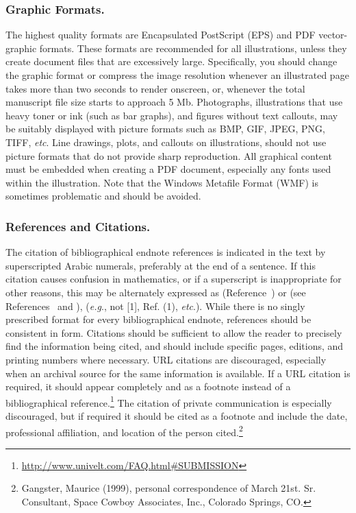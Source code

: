 \documentclass[letterpaper, preprint, paper,11pt]{AAS}	%
\begin{document}
\subsubsection{Graphic Formats.} 
The highest quality formats are Encapsulated PostScript (EPS) and PDF vector-graphic formats. These formats are recommended for all illustrations, unless they create document files that are excessively large. Specifically, you should change the graphic format or compress the image resolution whenever an illustrated page takes more than two seconds to render onscreen, or, whenever the total manuscript file size starts to approach 5 Mb. Photographs, illustrations that use heavy toner or ink (such as bar graphs), and figures without text callouts, may be suitably displayed with picture formats such as BMP, GIF, JPEG, PNG, TIFF, \emph{etc}. Line drawings, plots, and callouts on illustrations, should not use picture formats that do not provide sharp reproduction. All graphical content must be embedded when creating a PDF document, especially any fonts used within the illustration. Note that the Windows Metafile Format (WMF) is sometimes problematic and should be avoided.


\subsubsection{References and Citations.} 
The citation of bibliographical endnote references is indicated in the text by superscripted Arabic numerals, preferably at the end of a sentence.\cite{doe2005, style1959}   If this citation causes confusion in mathematics, or if a superscript is inappropriate for other reasons, this may be alternately expressed as (Reference~) or (see References~ and ), (\emph{e.g}., not [1], Ref. (1), \emph{etc}.). While there is no singly prescribed format for every bibliographical endnote, references should be consistent in form. Citations should be sufficient to allow the reader to precisely find the information being cited, and should include specific pages, editions, and printing numbers where necessary. URL citations are discouraged, especially when an archival source for the same information is available. If a URL citation is required, it should appear completely and as a footnote instead of a bibliographical reference.\footnote{\url{http://www.univelt.com/FAQ.html\#SUBMISSION}}  The citation of private communication is especially discouraged, but if required it should be cited as a footnote and include the date, professional affiliation, and location of the person cited.\footnote{Gangster, Maurice (1999), personal correspondence of March 21st. Sr. Consultant, Space Cowboy Associates, Inc., Colorado Springs, CO.}  
\end{document}
